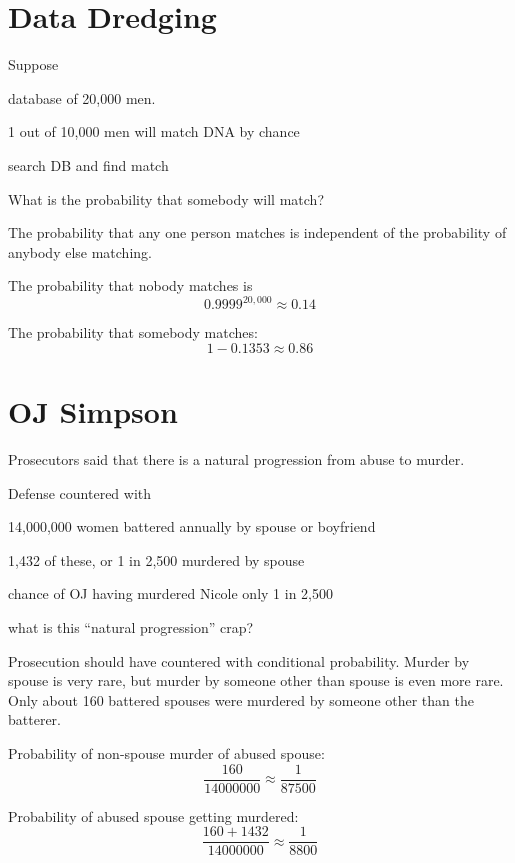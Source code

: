\documentclass[letterpaper, landscape]{exam}
\begin{document}
  \section{Data Dredging}
  Suppose 
  \begin{itemize*}
    \item database of 20,000 men.
    \item 1 out of 10,000 men will match DNA by chance
    \item search DB and find match
  \end{itemize*}

  What is the probability that somebody will match?

  \begin{solution}
    The probability that any one person matches is independent of the
    probability of anybody else matching.

    The probability that nobody matches is
    \[
      0.9999^{20,000} \approx 0.14
    \]

    The probability that somebody matches:
    \[
      1 - 0.1353 \approx 0.86
    \]
  \end{solution}

  \section{OJ Simpson}
  Prosecutors said that there is a natural progression from abuse to murder.

  Defense countered with 
  \begin{itemize*}
    \item 14,000,000 women battered annually by spouse or boyfriend
    \item 1,432 of these, or 1 in 2,500 murdered by spouse
    \item chance of OJ having murdered Nicole only 1 in 2,500
    \item what is this ``natural progression'' crap?
  \end{itemize*}

  Prosecution should have countered with conditional probability. Murder by
  spouse is very rare, but murder by someone other than spouse is even more
  rare. Only about 160 battered spouses were murdered by someone other than
  the batterer.

  Probability of non-spouse murder of abused spouse:
  \[
    \frac{160}{\num{ 14 000 000 }} \approx \frac{1}{\num{ 87 500 }}
  \]

  Probability of abused spouse getting murdered:
  \[
    \frac{160 + 1432}{\num{ 14 000 000 }} \approx \frac{1}{8800}
  \]
\end{document}
